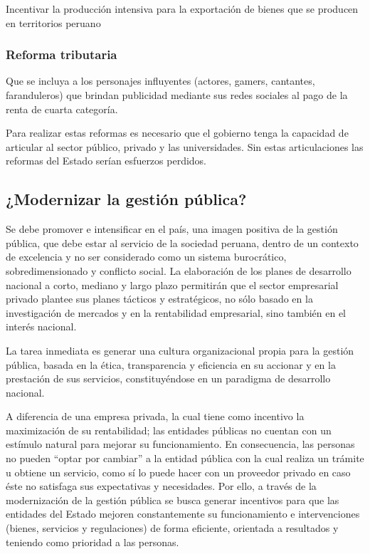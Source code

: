 \documentclass[
  letterpaper,
  DIV=11,
  numbers=noendperiod]{scrartcl}
\begin{document}
Incentivar la producción intensiva para la exportación de bienes que se
producen en territorios peruano

\hypertarget{reforma-tributaria}{%
\subsubsection{Reforma tributaria}\label{reforma-tributaria}}

Que se incluya a los personajes influyentes (actores, gamers, cantantes,
faranduleros) que brindan publicidad mediante sus redes sociales al pago
de la renta de cuarta categoría.

Para realizar estas reformas es necesario que el gobierno tenga la
capacidad de articular al sector público, privado y las universidades.
Sin estas articulaciones las reformas del Estado serían esfuerzos
perdidos.

\hypertarget{modernizar-la-gestiuxf3n-puxfablica}{%
\subsection{¿Modernizar la gestión
pública?}\label{modernizar-la-gestiuxf3n-puxfablica}}

Se debe promover e intensificar en el país, una imagen positiva de la
gestión pública, que debe estar al servicio de la sociedad peruana,
dentro de un contexto de excelencia y no ser considerado como un sistema
burocrático, sobredimensionado y conflicto social. La elaboración de los
planes de desarrollo nacional a corto, mediano y largo plazo permitirán
que el sector empresarial privado plantee sus planes tácticos y
estratégicos, no sólo basado en la investigación de mercados y en la
rentabilidad empresarial, sino también en el interés nacional.

La tarea inmediata es generar una cultura organizacional propia para la
gestión pública, basada en la ética, transparencia y eficiencia en su
accionar y en la prestación de sus servicios, constituyéndose en un
paradigma de desarrollo nacional.

A diferencia de una empresa privada, la cual tiene como incentivo la
maximización de su rentabilidad; las entidades públicas no cuentan con
un estímulo natural para mejorar su funcionamiento. En consecuencia, las
personas no pueden ``optar por cambiar'' a la entidad pública con la
cual realiza un trámite u obtiene un servicio, como sí lo puede hacer
con un proveedor privado en caso éste no satisfaga sus expectativas y
necesidades. Por ello, a través de la modernización de la gestión
pública se busca generar incentivos para que las entidades del Estado
mejoren constantemente su funcionamiento e intervenciones (bienes,
servicios y regulaciones) de forma eficiente, orientada a resultados y
teniendo como prioridad a las personas.
\end{document}
